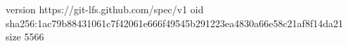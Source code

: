 version https://git-lfs.github.com/spec/v1
oid sha256:1ac79b88431061c7f42061e666f49545b291223ea4830a66e58c21af8f14da21
size 5566

